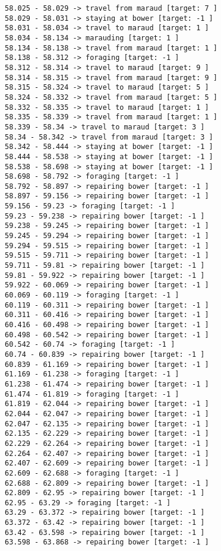 \documentclass[11pt]{article}
\begin{document}
\begin{Verbatim}[commandchars=\\\{\}]
58.025 - 58.029 -> travel from maraud [target: 7 ]
58.029 - 58.031 -> staying at bower [target: -1 ]
58.031 - 58.034 -> travel to maraud [target: 1 ]
58.034 - 58.134 -> marauding [target: 1 ]
58.134 - 58.138 -> travel from maraud [target: 1 ]
58.138 - 58.312 -> foraging [target: -1 ]
58.312 - 58.314 -> travel to maraud [target: 9 ]
58.314 - 58.315 -> travel from maraud [target: 9 ]
58.315 - 58.324 -> travel to maraud [target: 5 ]
58.324 - 58.332 -> travel from maraud [target: 5 ]
58.332 - 58.335 -> travel to maraud [target: 1 ]
58.335 - 58.339 -> travel from maraud [target: 1 ]
58.339 - 58.34 -> travel to maraud [target: 3 ]
58.34 - 58.342 -> travel from maraud [target: 3 ]
58.342 - 58.444 -> staying at bower [target: -1 ]
58.444 - 58.538 -> staying at bower [target: -1 ]
58.538 - 58.698 -> staying at bower [target: -1 ]
58.698 - 58.792 -> foraging [target: -1 ]
58.792 - 58.897 -> repairing bower [target: -1 ]
58.897 - 59.156 -> repairing bower [target: -1 ]
59.156 - 59.23 -> foraging [target: -1 ]
59.23 - 59.238 -> repairing bower [target: -1 ]
59.238 - 59.245 -> repairing bower [target: -1 ]
59.245 - 59.294 -> repairing bower [target: -1 ]
59.294 - 59.515 -> repairing bower [target: -1 ]
59.515 - 59.711 -> repairing bower [target: -1 ]
59.711 - 59.81 -> repairing bower [target: -1 ]
59.81 - 59.922 -> repairing bower [target: -1 ]
59.922 - 60.069 -> repairing bower [target: -1 ]
60.069 - 60.119 -> foraging [target: -1 ]
60.119 - 60.311 -> repairing bower [target: -1 ]
60.311 - 60.416 -> repairing bower [target: -1 ]
60.416 - 60.498 -> repairing bower [target: -1 ]
60.498 - 60.542 -> repairing bower [target: -1 ]
60.542 - 60.74 -> foraging [target: -1 ]
60.74 - 60.839 -> repairing bower [target: -1 ]
60.839 - 61.169 -> repairing bower [target: -1 ]
61.169 - 61.238 -> foraging [target: -1 ]
61.238 - 61.474 -> repairing bower [target: -1 ]
61.474 - 61.819 -> foraging [target: -1 ]
61.819 - 62.044 -> repairing bower [target: -1 ]
62.044 - 62.047 -> repairing bower [target: -1 ]
62.047 - 62.135 -> repairing bower [target: -1 ]
62.135 - 62.229 -> repairing bower [target: -1 ]
62.229 - 62.264 -> repairing bower [target: -1 ]
62.264 - 62.407 -> repairing bower [target: -1 ]
62.407 - 62.609 -> repairing bower [target: -1 ]
62.609 - 62.688 -> foraging [target: -1 ]
62.688 - 62.809 -> repairing bower [target: -1 ]
62.809 - 62.95 -> repairing bower [target: -1 ]
62.95 - 63.29 -> foraging [target: -1 ]
63.29 - 63.372 -> repairing bower [target: -1 ]
63.372 - 63.42 -> repairing bower [target: -1 ]
63.42 - 63.598 -> repairing bower [target: -1 ]
63.598 - 63.868 -> repairing bower [target: -1 ]

\end{Verbatim}
\end{document}
